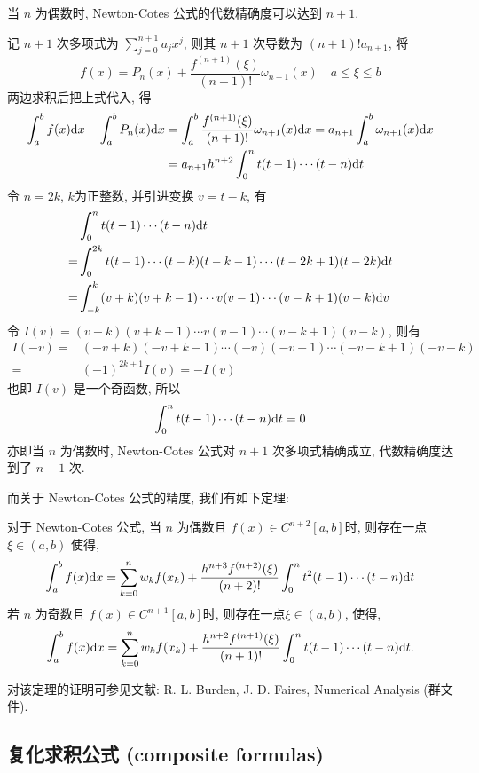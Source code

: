 \documentclass[a4paper]{ctexart}
\newcommand{\hl}[1]
{\noindent {\bf {#1}}}
\begin{document}
\hl{定理} 当 $n$ 为偶数时, Newton-Cotes 公式的代数精确度可以达到 $n + 1$.

\hl{证明}
记 $n + 1$ 次多项式为 $\sum^{n+1}_{j=0}a_jx^j$, 
则其 $n+1$ 次导数为 $(n+1)!a_{n+1}$, 将
\begin{equation}
  f(x) = P_n(x)+\frac{f^{(n+1)}(\xi)}{(n+1)!}\omega_{n+1}(x)\quad
  a\leq\xi\leq b 
  \end{equation}
两边求积后把上式代入, 得
\begin{align}
  \int^b_af(x){\rm d}x-\int^b_aP_n(x){\rm d}x&
  =\int^b_a\frac{f^{(n+1)}(\xi)}{(n+1)!}\omega_{n+1}(x){\rm d}x=a_{n+1}\int^b_a\omega_{n+1}(x){\rm d}x\\
  &=a_{n+1}h^{n+2}\int^n_0t(t-1)\cdots(t-n){\rm d}t    
\end{align}
令 $n=2k$, $k$为正整数, 并引进变换 $v=t-k$, 有
\begin{align}
  &\int^n_0t(t-1)\cdots(t-n){\rm d}t\\
  =&\int^{2k}_0t(t-1)\cdots(t-k)(t-k-1)\cdots(t-2k+1)(t-2k){\rm d}t\\
  =&\int^k_{-k}(v+k)(v+k-1)\cdots v(v-1)\cdots(v-k+1)(v-k){\rm d}v    
\end{align}
令 $I(v)=(v+k)(v+k-1)\cdots v(v-1)\cdots(v-k+1)(v-k)$, 则有
\begin{align}
  I(-v)=&(-v+k)(-v+k-1)\cdots (-v)(-v-1)\cdots(-v-k+1)(-v-k)\\
  =&(-1)^{2k+1}I(v)=-I(v)    
\end{align}
也即 $I(v)$ 是一个奇函数, 所以
$$
\int^n_0t(t-1)\cdots(t-n){\rm d}t=0
$$
亦即当 $n$ 为偶数时, Newton-Cotes 公式对 $n + 1$ 次多项式精确成立, 代数精确度达到了 $n + 1$ 次.

而关于 Newton-Cotes 公式的精度, 我们有如下定理:

\hl{定理}   
对于 Newton-Cotes 公式, 当 $n$ 为偶数且 
$f(x)\in C^{n+2}[a,b]$时, 则存在一点 $\xi\in(a,b)$ 使得, 
$$
\int^b_af(x){\rm d}x =\sum^n_{k=0}w_kf(x_k)+ \frac{h^{n+3}f^{(n+2)}(\xi)}{(n+2)!}
\int^n_0t^2(t-1)\cdots(t-n){\rm d}t
$$
若 $n$ 为奇数且 $f(x)\in C^{n+1}[a,b]$时, 则存在一点$\xi\in(a,b)$, 使得, 
$$
\int^b_af(x){\rm d}x =\sum^n_{k=0}w_kf(x_k)+ 
\frac{h^{n+2}f^{(n+1)}(\xi)}{(n+1)!}\int^n_0t(t-1)\cdots(t-n){\rm d}t.
$$

对该定理的证明可参见文献: R. L. Burden, J. D. Faires, Numerical Analysis (群文件).


\subsection{复化求积公式 (composite formulas)}
\end{document}
